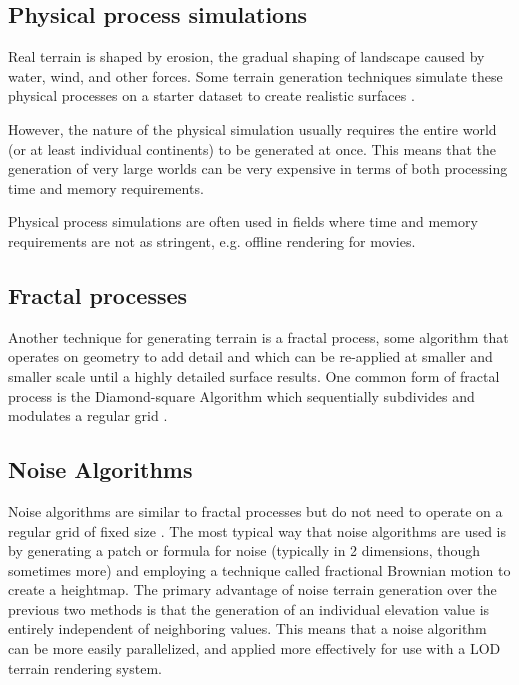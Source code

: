 \subsection{Physical process simulations}

Real terrain is shaped by erosion, the gradual shaping of landscape caused by water, wind, and other forces.
Some terrain generation techniques simulate these physical processes on a starter dataset to create realistic surfaces \cite{hydrology}.

However, the nature of the physical simulation usually requires the entire world (or at least individual continents) to be generated at once.
This means that the generation of very large worlds can be very expensive in terms of both processing time and memory requirements.

Physical process simulations are often used in fields where time and memory requirements are not as stringent, e.g. offline rendering for movies.


\subsection{Fractal processes}

Another technique for generating terrain is a fractal process, some algorithm that operates on geometry to add detail and which can be re-applied at smaller and smaller scale until a highly detailed surface results.
One common form of fractal process is the Diamond-square Algorithm which sequentially subdivides and modulates a regular grid \cite{def_rend_terrain}.


\subsection{Noise Algorithms}

Noise algorithms are similar to fractal processes but do not need to operate on a regular grid of fixed size \cite{perlin}.
The most typical way that noise algorithms are used is by generating a patch or formula for noise (typically in 2 dimensions, though sometimes more) and employing a technique called fractional Brownian motion to create a heightmap.
The primary advantage of noise terrain generation over the previous two methods is that the generation of an individual elevation value is entirely independent of neighboring values.
This means that a noise algorithm can be more easily parallelized, and applied more effectively for use with a LOD terrain rendering system.

